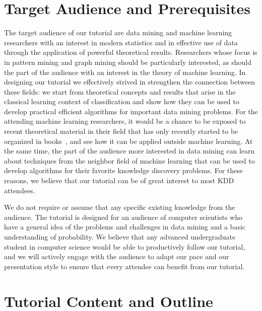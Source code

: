 \documentclass[11pt]{article}
\begin{document}
\section*{Target Audience and Prerequisites}
The target audience of our tutorial are data mining and machine learning
researchers with an interest in modern statistics and in effective use of data
through the application of powerful theoretical results. Researchers whose focus
is in pattern mining and graph mining should be particularly interested, as should
the part of the audience with an interest in the theory of machine learning. In
designing our tutorial we effectively strived in strengthen the connection
between these fields: we start from theoretical concepts and results that arise
in the classical learning context of classification and show how they can be
used to develop practical efficient algorithms for important data mining
problems. For the attending machine learning researchers, it would be a chance
to be exposed to recent theoretical material in their field that has only
recently started to be organized in books~\citep{MohriRT12,ShalevSBD14}, and see
how it can be applied outside machine learning. At the same time, the part of
the audience more interested in data mining can learn about techniques from the
neighbor field of machine learning that can be used to develop algorithms for
their favorite knowledge discovery problems. For these reasons, we believe that
our tutorial can be of great interest to most KDD attendees.

We do not require or assume that any specific existing knowledge from the
audience. The tutorial is designed for an audience of computer scientists who
have a general idea of the problems and challenges in data mining and a basic
understanding of probability. We believe that any advanced undergraduate student
in computer science would be able to productively follow our tutorial, and we
will actively engage with the audience to adapt our pace and our presentation
style to ensure that every attendee can benefit from our tutorial.

\section*{Tutorial Content and Outline}
\end{document}
